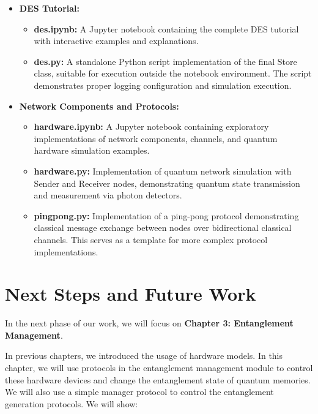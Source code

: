 \begin{itemize}
    \item \textbf{DES Tutorial:}
    \begin{itemize}
        \item \textbf{des.ipynb:} A Jupyter notebook containing the complete DES tutorial with interactive examples and explanations.
        
        \item \textbf{des.py:} A standalone Python script implementation of the final Store class, suitable for execution outside the notebook environment. The script demonstrates proper logging configuration and simulation execution.
    \end{itemize}
    
    \item \textbf{Network Components and Protocols:}
    \begin{itemize}
        \item \textbf{hardware.ipynb:} A Jupyter notebook containing exploratory implementations of network components, channels, and quantum hardware simulation examples.
        
        \item \textbf{hardware.py:} Implementation of quantum network simulation with Sender and Receiver nodes, demonstrating quantum state transmission and measurement via photon detectors.
        
        \item \textbf{pingpong.py:} Implementation of a ping-pong protocol demonstrating classical message exchange between nodes over bidirectional classical channels. This serves as a template for more complex protocol implementations.
    \end{itemize}
\end{itemize}

\section{Next Steps and Future Work}

In the next phase of our work, we will focus on \textbf{Chapter 3: Entanglement Management}.

In previous chapters, we introduced the usage of hardware models. In this chapter, we will use protocols in the entanglement management module to control these hardware devices and change the entanglement state of quantum memories. We will also use a simple manager protocol to control the entanglement generation protocols. We will show:

